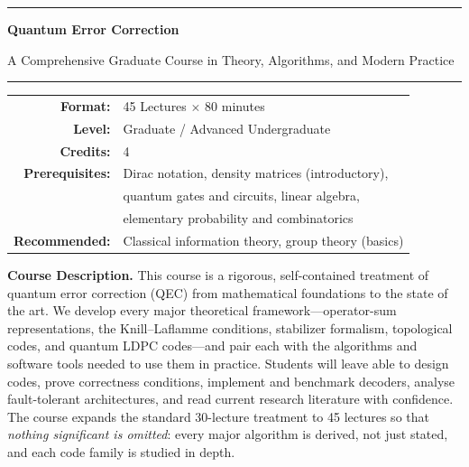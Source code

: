\documentclass[12pt,oneside]{article}
\begin{document}
\thispagestyle{empty}
\begin{center}
  \vspace*{1.4cm}
  {\color{primary}\rule{\textwidth}{2pt}}
  \vspace{0.4cm}

  {\fontsize{26}{32}\selectfont\bfseries\color{primary}
   Quantum Error Correction}

  \vspace{0.2cm}
  {\large\color{accent}
   A Comprehensive Graduate Course in Theory, Algorithms, and Modern Practice}

  \vspace{0.35cm}
  {\color{primary}\rule{\textwidth}{2pt}}

  \vspace{1.1cm}

  \begin{tabular}{rl}
    \color{primary}\textbf{Format:}       & 45 Lectures $\times$ 80 minutes \\[3pt]
    \color{primary}\textbf{Level:}        & Graduate / Advanced Undergraduate \\[3pt]
    \color{primary}\textbf{Credits:}      & 4 \\[3pt]
    \color{primary}\textbf{Prerequisites:} &
       Dirac notation, density matrices (introductory), \\
    & quantum gates and circuits, linear algebra, \\
    & elementary probability and combinatorics \\[3pt]
    \color{primary}\textbf{Recommended:}  &
       Classical information theory, group theory (basics) \\
  \end{tabular}

  \vspace{1.1cm}

  \begin{tcolorbox}[
    enhanced,colback=highlight,colframe=accent,
    arc=3pt,left=12pt,right=12pt,top=10pt,bottom=10pt,
    boxrule=0.8pt,width=0.94\textwidth
  ]
    \textbf{\color{primary}Course Description.}\enspace
    This course is a rigorous, self-contained treatment of quantum error correction (QEC)
    from mathematical foundations to the state of the art.
    We develop every major theoretical framework---operator-sum representations, the
    Knill--Laflamme conditions, stabilizer formalism, topological codes, and quantum
    LDPC codes---and pair each with the algorithms and software tools needed to use
    them in practice.
    Students will leave able to design codes, prove correctness conditions, implement
    and benchmark decoders, analyse fault-tolerant architectures, and read current
    research literature with confidence.
    The course expands the standard 30-lecture treatment to 45 lectures so that
    \emph{nothing significant is omitted}: every major algorithm is derived, not just
    stated, and each code family is studied in depth.
  \end{tcolorbox}


\end{center}
\end{document}
